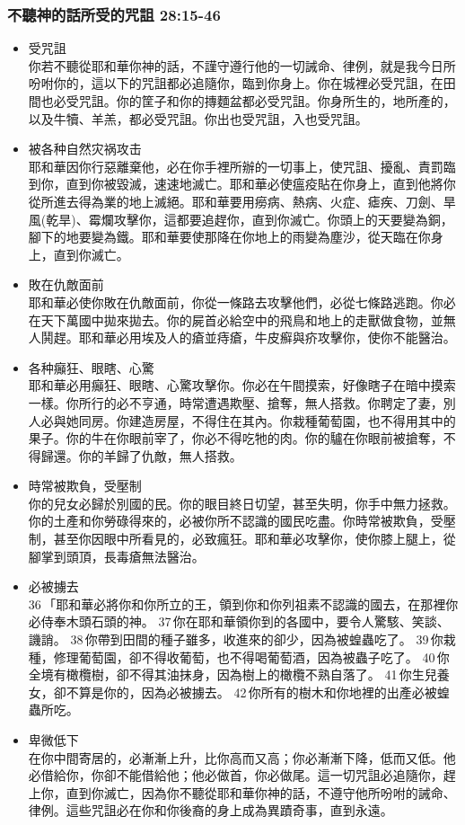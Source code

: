 \subsubsection{不聽神的話所受的咒詛 28:15-46}
\begin{itemize}
\item 受咒詛\\
你若不聽從耶和華你神的話，不謹守遵行他的一切誡命、律例，就是我今日所吩咐你的，這以下的咒詛都必追隨你，臨到你身上。你在城裡必受咒詛，在田間也必受咒詛。你的筐子和你的摶麵盆都必受咒詛。你身所生的，地所產的，以及牛犢、羊羔，都必受咒詛。你出也受咒詛，入也受咒詛。
\item 被各种自然灾祸攻击\\
耶和華因你行惡離棄他，必在你手裡所辦的一切事上，使咒詛、擾亂、責罰臨到你，直到你被毀滅，速速地滅亡。耶和華必使瘟疫貼在你身上，直到他將你從所進去得為業的地上滅絕。耶和華要用癆病、熱病、火症、瘧疾、刀劍、旱風(乾旱)、霉爛攻擊你，這都要追趕你，直到你滅亡。你頭上的天要變為銅，腳下的地要變為鐵。耶和華要使那降在你地上的雨變為塵沙，從天臨在你身上，直到你滅亡。
\item 敗在仇敵面前\\
耶和華必使你敗在仇敵面前，你從一條路去攻擊他們，必從七條路逃跑。你必在天下萬國中拋來拋去。你的屍首必給空中的飛鳥和地上的走獸做食物，並無人鬨趕。耶和華必用埃及人的瘡並痔瘡，牛皮癬與疥攻擊你，使你不能醫治。 
\item 各种癲狂、眼瞎、心驚\\
耶和華必用癲狂、眼瞎、心驚攻擊你。你必在午間摸索，好像瞎子在暗中摸索一樣。你所行的必不亨通，時常遭遇欺壓、搶奪，無人搭救。你聘定了妻，別人必與她同房。你建造房屋，不得住在其內。你栽種葡萄園，也不得用其中的果子。你的牛在你眼前宰了，你必不得吃牠的肉。你的驢在你眼前被搶奪，不得歸還。你的羊歸了仇敵，無人搭救。
\item 時常被欺負，受壓制\\
你的兒女必歸於別國的民。你的眼目終日切望，甚至失明，你手中無力拯救。你的土產和你勞碌得來的，必被你所不認識的國民吃盡。你時常被欺負，受壓制，甚至你因眼中所看見的，必致瘋狂。耶和華必攻擊你，使你膝上腿上，從腳掌到頭頂，長毒瘡無法醫治。
\item 必被擄去\\
36 「耶和華必將你和你所立的王，領到你和你列祖素不認識的國去，在那裡你必侍奉木頭石頭的神。 37 你在耶和華領你到的各國中，要令人驚駭、笑談、譏誚。 38 你帶到田間的種子雖多，收進來的卻少，因為被蝗蟲吃了。 39 你栽種，修理葡萄園，卻不得收葡萄，也不得喝葡萄酒，因為被蟲子吃了。 40 你全境有橄欖樹，卻不得其油抹身，因為樹上的橄欖不熟自落了。 41 你生兒養女，卻不算是你的，因為必被擄去。 42 你所有的樹木和你地裡的出產必被蝗蟲所吃。
\item 卑微低下\\
在你中間寄居的，必漸漸上升，比你高而又高；你必漸漸下降，低而又低。他必借給你，你卻不能借給他；他必做首，你必做尾。這一切咒詛必追隨你，趕上你，直到你滅亡，因為你不聽從耶和華你神的話，不遵守他所吩咐的誡命、律例。這些咒詛必在你和你後裔的身上成為異蹟奇事，直到永遠。
\end{itemize}

